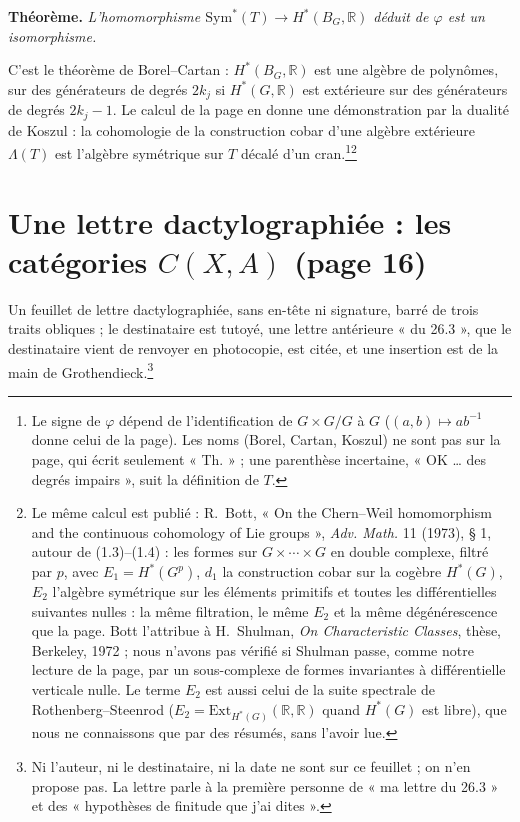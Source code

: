 \documentclass[11pt,a4paper]{article}
\begin{document}
\textbf{Théorème.} \emph{L'homomorphisme $\mathrm{Sym}^{*}(T) \to
H^{*}(B_{G},\mathbb{R})$ déduit de $\varphi$ est un isomorphisme.}

C'est le théorème de Borel--Cartan : $H^{*}(B_{G},\mathbb{R})$ est une algèbre
de polynômes, sur des générateurs de degrés $2k_{j}$ si $H^{*}(G,\mathbb{R})$
est extérieure sur des générateurs de degrés $2k_{j} - 1$. Le calcul de la
page en donne une démonstration par la dualité de Koszul : la cohomologie
de la construction cobar d'une algèbre extérieure $\Lambda(T)$ est l'algèbre
symétrique sur $T$ décalé d'un cran.\footnote{Le signe de $\varphi$ dépend de
l'identification de $G \times G/G$ à $G$ ($(a,b) \mapsto ab^{-1}$ donne celui
de la page). Les noms (Borel, Cartan, Koszul) ne sont pas sur la page,
qui écrit seulement « Th. » ; une parenthèse incertaine, « OK \ldots{} des
degrés impairs », suit la définition de $T$.}\footnote{Le même calcul est
publié : R.~Bott, « On the Chern--Weil homomorphism and the continuous
cohomology of Lie groups », \emph{Adv. Math.} 11 (1973), § 1, autour de
(1.3)--(1.4) : les formes sur $G \times \cdots \times G$ en double complexe,
filtré par $p$, avec $E_{1} = H^{*}(G^{p})$, $d_{1}$ la construction cobar
sur la cogèbre $H^{*}(G)$, $E_{2}$ l'algèbre symétrique sur les éléments
primitifs et toutes les différentielles suivantes nulles : la même
filtration, le même $E_{2}$ et la même dégénérescence que la page. Bott
l'attribue à H.~Shulman, \emph{On Characteristic Classes}, thèse, Berkeley,
1972 ; nous n'avons pas vérifié si Shulman passe, comme notre lecture de la
page, par un sous-complexe de formes invariantes à différentielle verticale
nulle. Le terme $E_{2}$ est aussi celui de la suite spectrale de
Rothenberg--Steenrod ($E_{2} = \mathrm{Ext}_{H^{*}(G)}(\mathbb{R},\mathbb{R})$
quand $H^{*}(G)$ est libre), que nous ne connaissons que par des résumés,
sans l'avoir lue.}

\section*{Une lettre dactylographiée : les catégories $C(X,A)$ (page 16)}

Un feuillet de lettre dactylographiée, sans en-tête ni signature, barré de
trois traits obliques ; le destinataire est tutoyé, une lettre antérieure « du
26.3 », que le destinataire vient de renvoyer en photocopie, est citée, et une
insertion est de la main de Grothendieck.\footnote{Ni l'auteur, ni le
destinataire, ni la date ne sont sur ce feuillet ; on n'en propose pas. La
lettre parle à la première personne de « ma lettre du 26.3 » et des
« hypothèses de finitude que j'ai dites ».}
\end{document}
